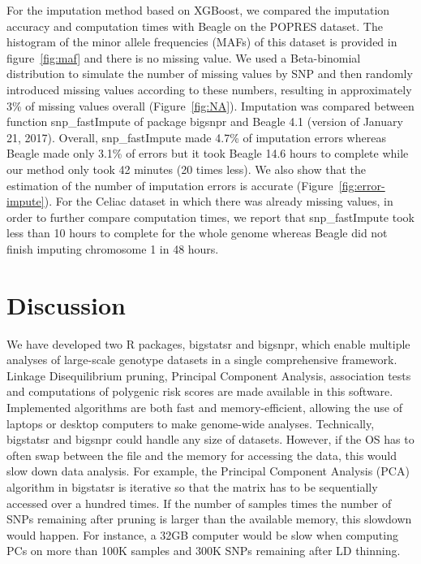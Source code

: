 \documentclass{bioinfo}
\begin{document}
For the imputation method based on XGBoost, we compared  the imputation accuracy and computation times with Beagle on the POPRES dataset. The histogram of the minor allele frequencies (MAFs) of this dataset is provided in figure~\ref{fig:maf} and there is no missing value. 
We used a Beta-binomial distribution to simulate the number of missing values by SNP and then randomly introduced missing values according to these numbers, resulting in approximately 3\% of missing values overall (Figure~\ref{fig:NA}). Imputation was compared between function snp\_fastImpute of package bigsnpr and Beagle 4.1 (version of January 21, 2017). Overall, snp\_fastImpute made 4.7\% of imputation errors whereas Beagle made only 3.1\% of errors but it took Beagle 14.6 hours to complete while our method only took 42 minutes (20 times less). 
We also show that the estimation of the number of imputation errors is accurate (Figure~\ref{fig:error-impute}).
For the Celiac dataset in which there was already missing values, in order to further compare computation times, we report that snp\_fastImpute took less than 10 hours to complete for the whole genome whereas Beagle did not finish imputing chromosome 1 in 48 hours. 



\section{Discussion}

We have developed two R packages, bigstatsr and bigsnpr, which enable multiple analyses of large-scale genotype datasets in a single comprehensive framework. Linkage Disequilibrium pruning, Principal Component Analysis, association tests and computations of polygenic risk scores are made available in this software. Implemented algorithms are both fast and memory-efficient, allowing the use of laptops or desktop computers to make genome-wide analyses. 
Technically, bigstatsr and bigsnpr could handle any size of datasets. However, if the OS has to often swap between the file and the memory for accessing the data, this would slow down data analysis. For example, the Principal Component Analysis (PCA) algorithm in bigstatsr is iterative so that the matrix has to be sequentially accessed over a hundred times. If the number of samples times the number of SNPs remaining after pruning is larger than the available memory, this slowdown would happen. For instance, a 32GB computer would be slow when computing PCs on more than 100K samples and 300K SNPs remaining after LD thinning.
\end{document}
